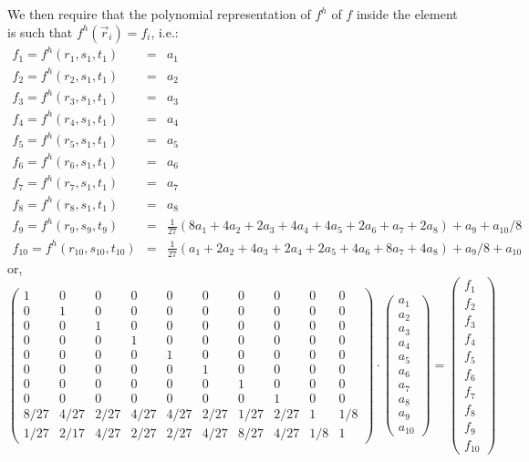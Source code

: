 We then require that the polynomial representation of $f^h$ of $f$ inside the element
is such that $f^h(\vec{r}_i)=f_i$, i.e.:
\begin{eqnarray}
f_1 = f^h(r_1,s_1,t_1) &=& a_1  \nonumber\\
f_2 = f^h(r_2,s_1,t_1) &=& a_2  \nonumber\\
f_3 = f^h(r_3,s_1,t_1) &=& a_3  \nonumber\\
f_4 = f^h(r_4,s_1,t_1) &=& a_4  \nonumber\\
f_5 = f^h(r_5,s_1,t_1) &=& a_5  \nonumber\\
f_6 = f^h(r_6,s_1,t_1) &=& a_6  \nonumber\\
f_7 = f^h(r_7,s_1,t_1) &=& a_7  \nonumber\\
f_8 = f^h(r_8,s_1,t_1) &=& a_8  \nonumber\\
f_9 = f^h(r_9,s_9,t_9) &=&  \frac{1}{27} (8a_1 + 4a_2 + 2a_3 +4a_4 + 4a_5 + 2a_6 + a_7 +2a_8)  + a_9 + a_{10}/8 
\nonumber\\
f_{10} = f^h(r_{10},s_{10},t_{10}) &=& \frac{1}{27} (a_1 + 2a_2 + 4a_3 +2a_4 + 2a_5 + 4a_6 + 8a_7 +4a_8)  + a_9/8 + a_{10} \nonumber
\end{eqnarray}
or,
\[
\left(
\begin{array}{cccccccccc}
1 &0 &0 &0 &0 &0 &0 &0 &0 &0 \\
0 &1 &0 &0 &0 &0 &0 &0 &0 &0 \\
0 &0 &1 &0 &0 &0 &0 &0 &0 &0 \\
0 &0 &0 &1 &0 &0 &0 &0 &0 &0 \\
0 &0 &0 &0 &1 &0 &0 &0 &0 &0 \\
0 &0 &0 &0 &0 &1 &0 &0 &0 &0 \\
0 &0 &0 &0 &0 &0 &1 &0 &0 &0 \\
0 &0 &0 &0 &0 &0 &0 &1 &0 &0 \\
8/27 & 4/27 & 2/27  & 4/27 & 4/27 & 2/27& 1/27& 2/27 &1 & 1/8\\
1/27 & 2/17 & 4/27 & 2/27 & 2/27& 4/27& 8/27& 4/27& 1/8  &1 
\end{array}
\right)
\cdot
\left(
\begin{array}{c}
a_1 \\ a_2 \\ a_3 \\ a_4 \\ a_5 \\ a_6 \\ a_7 \\ a_8 \\ a_9 \\ a_{10}
\end{array}
\right)
=
\left(
\begin{array}{c}
f_1 \\ f_2 \\ f_3 \\ f_4 \\ f_5 \\ f_6 \\ f_7 \\ f_8 \\ f_9 \\ f_{10}
\end{array}
\right)
\]
